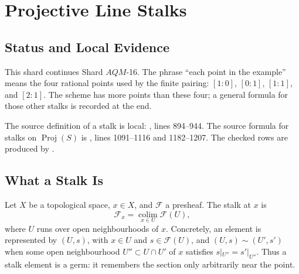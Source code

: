 
\section{Projective Line Stalks}
\label{sec:projective-line-stalks}

\subsection{Status and Local Evidence}

This shard continues Shard \(AQM\)-16.  The phrase ``each point in the
example'' means the four rational points used by the finite pairing:
\([1:0]\), \([0:1]\), \([1:1]\), and \([2:1]\).  The scheme has more points
than these four; a general formula for those other stalks is recorded at the
end.

The source definition of a stalk is local:
, lines
894--944.  The source formula for stalks on \(\operatorname{Proj}(S)\) is
, lines
1091--1116 and 1182--1207.  The checked rows are produced by
.

\subsection{What a Stalk Is}

Let \(X\) be a topological space, \(x\in X\), and \(\mathcal F\) a presheaf.
The stalk at \(x\) is
\[
  \mathcal F_x=\operatorname*{colim}_{x\in U}\mathcal F(U),
\]
where \(U\) runs over open neighbourhoods of \(x\).  Concretely, an element is
represented by \((U,s)\), with \(x\in U\) and \(s\in\mathcal F(U)\), and
\((U,s)\sim(U',s')\) when some open neighbourhood
\(U''\subset U\cap U'\) of \(x\) satisfies \(s|_{U''}=s'|_{U''}\).
Thus a stalk element is a germ: it remembers the section only arbitrarily near
the point.

